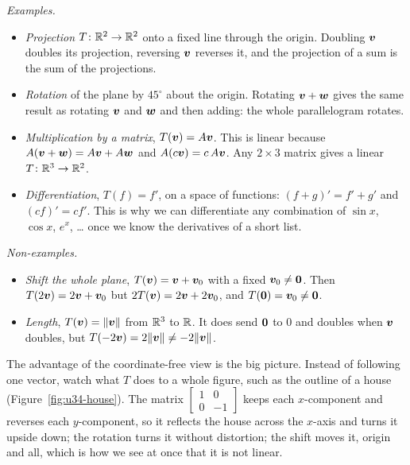 \emph{Examples.}
\begin{itemize}
  \item \emph{Projection} $T\colon\mathbb{R}^2\to\mathbb{R}^2$ onto a fixed line through the origin. Doubling
        $\boldsymbol{v}$ doubles its projection, reversing $\boldsymbol{v}$ reverses it, and the projection of a sum is the
        sum of the projections.
  \item \emph{Rotation} of the plane by $45^\circ$ about the origin. Rotating $\boldsymbol{v}+\boldsymbol{w}$ gives the
        same result as rotating $\boldsymbol{v}$ and $\boldsymbol{w}$ and then adding: the whole parallelogram rotates.
  \item \emph{Multiplication by a matrix}, $T(\boldsymbol{v})=A\boldsymbol{v}$. This is linear because
        $A(\boldsymbol{v}+\boldsymbol{w})=A\boldsymbol{v}+A\boldsymbol{w}$ and $A(c\boldsymbol{v})=c\,A\boldsymbol{v}$. Any $2\times3$ matrix gives a linear
        $T\colon\mathbb{R}^3\to\mathbb{R}^2$.
  \item \emph{Differentiation}, $T(f)=f'$, on a space of functions: $(f+g)'=f'+g'$ and $(cf)'=cf'$.
        This is why we can differentiate any combination of $\sin x$, $\cos x$, $e^x$, \dots{} once we
        know the derivatives of a short list.
\end{itemize}

\emph{Non-examples.}
\begin{itemize}
  \item \emph{Shift the whole plane}, $T(\boldsymbol{v})=\boldsymbol{v}+\boldsymbol{v}_0$ with a fixed $\boldsymbol{v}_0\ne\boldsymbol{0}$. Then
        $T(2\boldsymbol{v})=2\boldsymbol{v}+\boldsymbol{v}_0$ but $2T(\boldsymbol{v})=2\boldsymbol{v}+2\boldsymbol{v}_0$, and $T(\boldsymbol{0})=\boldsymbol{v}_0\ne\boldsymbol{0}$.
  \item \emph{Length}, $T(\boldsymbol{v})=\|\boldsymbol{v}\|$ from $\mathbb{R}^3$ to $\mathbb{R}$. It does send $\boldsymbol{0}$ to $0$ and doubles
        when $\boldsymbol{v}$ doubles, but $T(-2\boldsymbol{v})=2\|\boldsymbol{v}\|\ne-2\|\boldsymbol{v}\|$.
\end{itemize}

The advantage of the coordinate-free view is the big picture. Instead of following one vector,
watch what $T$ does to a whole figure, such as the outline of a house (Figure~\ref{fig:u34-house}).
The matrix $\left[\begin{smallmatrix}1&0\\0&-1\end{smallmatrix}\right]$ keeps each $x$-component and
reverses each $y$-component, so it reflects the house across the $x$-axis and turns it upside
down; the rotation turns it without distortion; the shift moves it, origin and all, which is how
we see at once that it is not linear.

